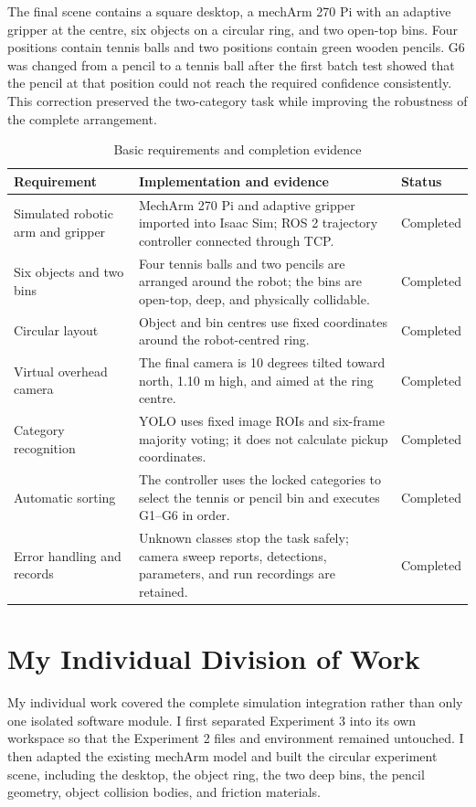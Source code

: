 \documentclass[12pt,a4paper]{article}
\begin{document}
The final scene contains a square desktop, a mechArm 270 Pi with an adaptive gripper at the centre, six objects on a circular ring, and two open-top bins. Four positions contain tennis balls and two positions contain green wooden pencils. G6 was changed from a pencil to a tennis ball after the first batch test showed that the pencil at that position could not reach the required confidence consistently. This correction preserved the two-category task while improving the robustness of the complete arrangement.

\begin{table}[H]
\centering
\caption{Basic requirements and completion evidence}
\begin{tabularx}{\textwidth}{p{4.0cm}Y p{2.2cm}}
\toprule
Requirement & Implementation and evidence & Status\\
\midrule
Simulated robotic arm and gripper & MechArm 270 Pi and adaptive gripper imported into Isaac Sim; ROS 2 trajectory controller connected through TCP. & Completed\\
Six objects and two bins & Four tennis balls and two pencils are arranged around the robot; the bins are open-top, deep, and physically collidable. & Completed\\
Circular layout & Object and bin centres use fixed coordinates around the robot-centred ring. & Completed\\
Virtual overhead camera & The final camera is 10 degrees tilted toward north, 1.10 m high, and aimed at the ring centre. & Completed\\
Category recognition & YOLO uses fixed image ROIs and six-frame majority voting; it does not calculate pickup coordinates. & Completed\\
Automatic sorting & The controller uses the locked categories to select the tennis or pencil bin and executes G1--G6 in order. & Completed\\
Error handling and records & Unknown classes stop the task safely; camera sweep reports, detections, parameters, and run recordings are retained. & Completed\\
\bottomrule
\end{tabularx}
\end{table}

\section{My Individual Division of Work}

My individual work covered the complete simulation integration rather than only one isolated software module. I first separated Experiment 3 into its own workspace so that the Experiment 2 files and environment remained untouched. I then adapted the existing mechArm model and built the circular experiment scene, including the desktop, the object ring, the two deep bins, the pencil geometry, object collision bodies, and friction materials.
\end{document}
